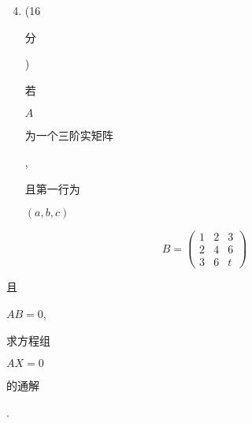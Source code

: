 \documentclass[10pt]{article}
\begin{document}
\begin{enumerate}
  \setcounter{enumi}{3}
  \item (16 \begin{CJK}{UTF8}{mj}分\end{CJK}) \begin{CJK}{UTF8}{mj}若\end{CJK} $A$ \begin{CJK}{UTF8}{mj}为一个三阶实矩阵\end{CJK}, \begin{CJK}{UTF8}{mj}且第一行为\end{CJK} $(a, b, c)$
\end{enumerate}
$$
B=\left(\begin{array}{lll}
1 & 2 & 3 \\
2 & 4 & 6 \\
3 & 6 & t
\end{array}\right)
$$
\begin{CJK}{UTF8}{mj}且\end{CJK} $A B=0$, \begin{CJK}{UTF8}{mj}求方程组\end{CJK} $A X=0$ \begin{CJK}{UTF8}{mj}的通解\end{CJK}.
\end{document}
